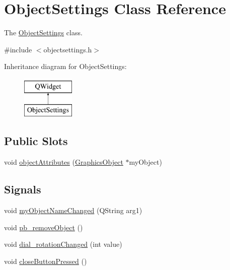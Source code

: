 \hypertarget{class_object_settings}{}\section{Object\+Settings Class Reference}
\label{class_object_settings}


The \hyperlink{class_object_settings}{Object\+Settings} class.  




{\ttfamily \#include $<$objectsettings.\+h$>$}

Inheritance diagram for Object\+Settings\+:\begin{figure}[H]
\begin{center}
\leavevmode
\includegraphics[height=2.000000cm]{class_object_settings}
\end{center}
\end{figure}
\subsection*{Public Slots}
\begin{DoxyCompactItemize}
\item 
void \hyperlink{class_object_settings_a47aec256bb36db5eda17686a38294932}{object\+Attributes} (\hyperlink{class_graphics_object}{Graphics\+Object} $\ast$my\+Object)
\end{DoxyCompactItemize}
\subsection*{Signals}
\begin{DoxyCompactItemize}
\item 
void \hyperlink{class_object_settings_a0b6604a8c84bd495e744fbe3012eca89}{my\+Object\+Name\+Changed} (Q\+String arg1)
\item 
void \hyperlink{class_object_settings_a748b6c75fd1d8a63314f1ebd585c51ce}{pb\+\_\+remove\+Object} ()
\item 
void \hyperlink{class_object_settings_a951847088536bc75bea1cf55418e895f}{dial\+\_\+rotation\+Changed} (int value)
\item 
void \hyperlink{class_object_settings_aaf878088ff438a5508f51cd9b639497e}{close\+Button\+Pressed} ()
\end{DoxyCompactItemize}

